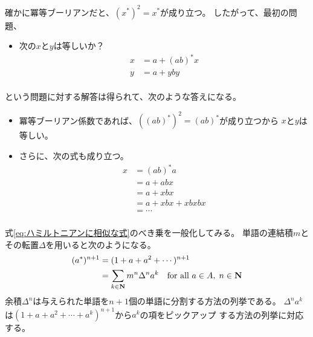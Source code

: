 	確かに冪等ブーリアンだと、$(x^*)^2=x^*$が成り立つ。
	したがって、最初の問題、
	\begin{itemize}\setlength{\itemsep}{-1mm} %
		\item 次の$x$と$y$は等しいか？
		\begin{equation*}\begin{split} %
			x &= a + (ab)^*x \\
			y &= a + yby \\
		\end{split}\end{equation*} %
	\end{itemize} %
	という問題に対する解答は得られて、次のような答えになる。
	\begin{itemize}\setlength{\itemsep}{-1mm} %
		\item 冪等ブーリアン係数であれば、$((ab)^*)^2=(ab)^*$が成り立つから
		$x$と$y$は等しい。
		\item さらに、次の式も成り立つ。
		\begin{equation*}\begin{split} %
			x &= (ab)^*a \\
			&= a + abx \\
			&= a + xbx \\
			&= a + xbx + xbxbx \\
			&= \cdots \\
		\end{split}\end{equation*} %
	\end{itemize} %

	式\eqref{eq:ハミルトニアンに相似な式}のべき乗を一般化してみる。
	単語の連結積$m$とその転置$\Delta$を用いると次のようになる。
	\begin{equation}\label{eq:単語に対するハミルトニアンを用いた式}\begin{split} %
		(a^*)^{n+1} &= (1+ a + a^2 + \cdots)^{n+1} \\
		&= \sum_{k\in\mybf{N}}m^n\Delta^na^k
		\quad\text{for all }a\in A,\;n\in\mybf{N}
	\end{split}\end{equation} %
	余積$\Delta^n$は与えられた単語を$n+1$個の単語に分割する方法の列挙である。
	$\Delta^na^k$は$(1+a+a^2+\cdots+a^k)^{n+1}$から$a^k$の項をピックアップ
	する方法の列挙に対応する。

